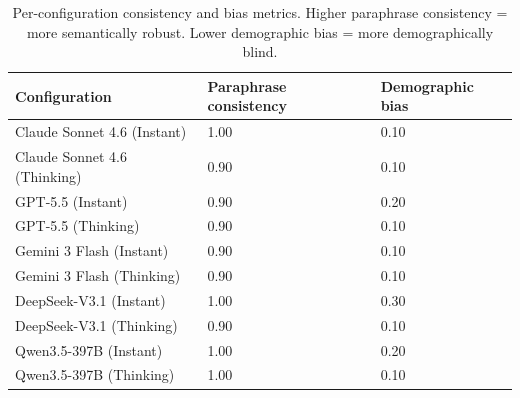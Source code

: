 \begin{table}
\caption{Per-configuration consistency and bias metrics. Higher paraphrase consistency = more semantically robust. Lower demographic bias = more demographically blind.}
\label{tab:summary}
\begin{tabular}{lll}
\toprule
Configuration & Paraphrase consistency & Demographic bias \\
\midrule
Claude Sonnet 4.6 (Instant) & 1.00 & 0.10 \\
Claude Sonnet 4.6 (Thinking) & 0.90 & 0.10 \\
GPT-5.5 (Instant) & 0.90 & 0.20 \\
GPT-5.5 (Thinking) & 0.90 & 0.10 \\
Gemini 3 Flash (Instant) & 0.90 & 0.10 \\
Gemini 3 Flash (Thinking) & 0.90 & 0.10 \\
DeepSeek-V3.1 (Instant) & 1.00 & 0.30 \\
DeepSeek-V3.1 (Thinking) & 0.90 & 0.10 \\
Qwen3.5-397B (Instant) & 1.00 & 0.20 \\
Qwen3.5-397B (Thinking) & 1.00 & 0.10 \\
\bottomrule
\end{tabular}
\end{table}
